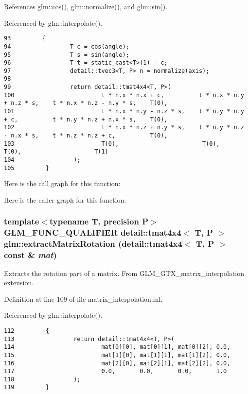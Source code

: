 References glm::cos(), glm::normalize(), and glm::sin().

Referenced by glm::interpolate().

\begin{Code}\begin{verbatim}93         {
94                 T c = cos(angle);
95                 T s = sin(angle);
96                 T t = static_cast<T>(1) - c;
97                 detail::tvec3<T, P> n = normalize(axis);
98 
99                 return detail::tmat4x4<T, P>(
100                         t * n.x * n.x + c,          t * n.x * n.y + n.z * s,    t * n.x * n.z - n.y * s,    T(0),
101                         t * n.x * n.y - n.z * s,    t * n.y * n.y + c,          t * n.y * n.z + n.x * s,    T(0),
102                         t * n.x * n.z + n.y * s,    t * n.y * n.z - n.x * s,    t * n.z * n.z + c,          T(0),
103                         T(0),                        T(0),                        T(0),                     T(1)
104                 );
105         }
\end{verbatim}
\end{Code}




Here is the call graph for this function:

Here is the caller graph for this function:\hypertarget{group__gtx__matrix__interpolation_gf559937fe5cea133f5e7f3c228255960}{
\subsubsection[extractMatrixRotation]{\setlength{\rightskip}{0pt plus 5cm}template$<$typename T, precision P$>$ GLM\_\-FUNC\_\-QUALIFIER detail::tmat4x4$<$ T, P $>$ glm::extractMatrixRotation (detail::tmat4x4$<$ T, P $>$ const \& {\em mat})}}
\label{group__gtx__matrix__interpolation_gf559937fe5cea133f5e7f3c228255960}


Extracts the rotation part of a matrix. From GLM\_\-GTX\_\-matrix\_\-interpolation extension. 

Definition at line 109 of file matrix\_\-interpolation.inl.

Referenced by glm::interpolate().

\begin{Code}\begin{verbatim}112         {
113                 return detail::tmat4x4<T, P>(
114                         mat[0][0], mat[0][1], mat[0][2], 0.0,
115                         mat[1][0], mat[1][1], mat[1][2], 0.0,
116                         mat[2][0], mat[2][1], mat[2][2], 0.0,
117                         0.0,       0.0,       0.0,       1.0
118                 );
119         }
\end{verbatim}
\end{Code}




